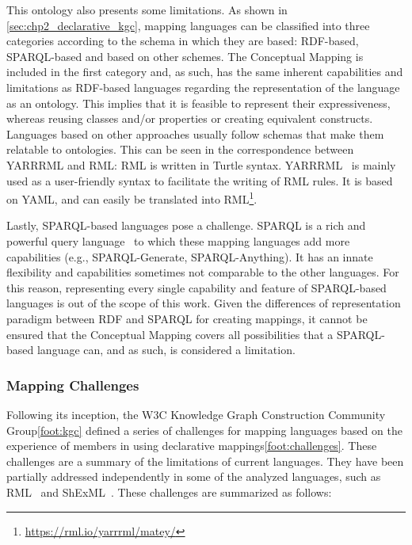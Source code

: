 This ontology also presents some limitations. As shown in \cref{sec:chp2_declarative_kgc}, mapping languages can be classified into three categories according to the schema in which they are based: RDF-based, SPARQL-based and based on other schemes. The Conceptual Mapping is included in the first category and, as such, has the same inherent capabilities and limitations as RDF-based languages regarding the representation of the language as an ontology. This implies that it is feasible to represent their expressiveness, whereas reusing classes and/or properties or creating equivalent constructs. Languages based on other approaches usually follow schemas that make them relatable to ontologies. This can be seen in the correspondence between YARRRML and RML: RML is written in Turtle syntax. YARRRML~\parencite{Heyvaert2018yarrrml} is mainly used as a user-friendly syntax to facilitate the writing of RML rules. It is based on YAML, and can easily be translated into RML\footnote{\url{https://rml.io/yarrrml/matey/}}. 

Lastly, SPARQL-based languages pose a challenge. SPARQL is a rich and powerful query language~\parencite{perez2009semantics} to which these mapping languages add more capabilities (e.g., SPARQL-Generate, SPARQL-Anything). It has an innate flexibility and capabilities sometimes not comparable to the other languages. For this reason, representing every single capability and feature of SPARQL-based languages is out of the scope of this work. Given the differences of representation paradigm between RDF and SPARQL for creating mappings, it cannot be ensured that the Conceptual Mapping covers all possibilities that a SPARQL-based language can, and as such, is considered a limitation.


\subsubsection{Mapping Challenges}
\label{sec:chp4_mapping_challenges}

Following its inception, the W3C Knowledge Graph Construction Community Group\cref{foot:kgc} defined a series of challenges for mapping languages based on the experience of members in using declarative mappings\cref{foot:challenges}. These challenges are a summary of the limitations of current languages. They have been partially addressed independently in some of the analyzed languages, such as RML~\parencite{delva2021rml-fields,iglesias2023rml} and ShExML~\parencite{garcia2021shexml-challenges}. These challenges are summarized as follows:

